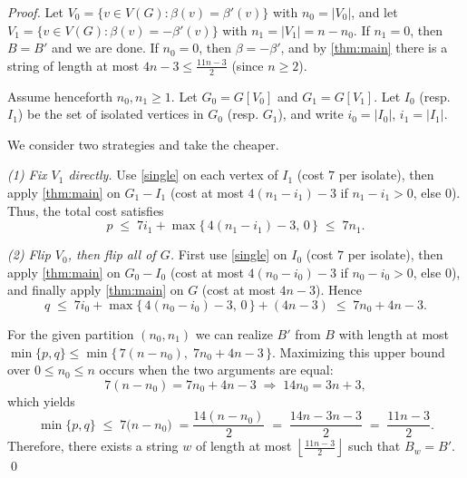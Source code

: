 \documentclass[10pt,a4paper]{amsart}
\begin{document}
\begin{proof}
    Let $V_0 = \{v \in V(G) : \beta(v) = \beta'(v)\}$ with $n_0 = |V_0|$, and 
    let $V_1 = \{v \in V(G) : \beta(v) = -\beta'(v)\}$ with $n_1 = |V_1| = n - n_0$.
    If $n_1 = 0$, then $B = B'$ and we are done.
    If $n_0 = 0$, then $\beta = -\beta'$, and by \autoref{thm:main} there is a string of length at most $4n-3 \leq \frac{11n-3}{2}$ (since $n \ge 2$).

    Assume henceforth $n_0, n_1 \ge 1$.
    Let $G_0 = G[V_0]$ and $G_1 = G[V_1]$.
    Let $I_0$ (resp. $I_1$) be the set of isolated vertices in $G_0$ (resp. $G_1$), and write $i_0 = |I_0|$, $i_1 = |I_1|$.

    We consider two strategies and take the cheaper.

    \smallskip\noindent\emph{(1) Fix $V_1$ directly.}
    Use \autoref{single} on each vertex of $I_1$ (cost $7$ per isolate), then apply \autoref{thm:main} on $G_1 - I_1$ (cost at most $4(n_1 - i_1) - 3$ if $n_1 - i_1 > 0$, else $0$).
    Thus, the total cost satisfies
    \[
        p \;\le\; 7 i_1 + \max\{\,4(n_1 - i_1) - 3,\,0\,\} \;\le\; 7 n_1.
    \]

    \smallskip\noindent\emph{(2) Flip $V_0$, then flip all of $G$.}
    First use \autoref{single} on $I_0$ (cost $7$ per isolate), then apply \autoref{thm:main} on $G_0 - I_0$ (cost at most $4(n_0 - i_0) - 3$ if $n_0 - i_0 > 0$, else $0$), and finally apply \autoref{thm:main} on $G$ (cost at most $4n - 3$). 
    Hence
    \[
        q \;\le\; 7 i_0 + \max\{\,4(n_0 - i_0) - 3,\,0\,\} + (4n - 3) \;\le\; 7 n_0 + 4n - 3.
    \]

    For the given partition $(n_0,n_1)$ we can realize $B'$ from $B$ with length at most $\min\{p,q\} \le \min\{\,7(n-n_0),\; 7n_0 + 4n - 3\,\}$.
    Maximizing this upper bound over $0 \le n_0 \le n$ occurs when the two arguments are equal:
    \[
        7(n - n_0) = 7n_0 + 4n - 3 
        \;\Longrightarrow\;
        14n_0 =3n+3,
    \]
    which yields
    \[
        \min\{p,q\} \;\le\; 7\bigl(n - n_0\bigr)\;=\frac{14(n-n_0)}{2}\;=\;\frac{14n-3n-3}{2}
        \;= \;  \frac{11n - 3}{2} .
    \]
    Therefore, there exists a string $w$ of length at most $ \left \lfloor \tfrac{11n-3}{2}\right \rfloor$ such that $B_w = B'$.
    \qed
\end{proof}
\end{document}
